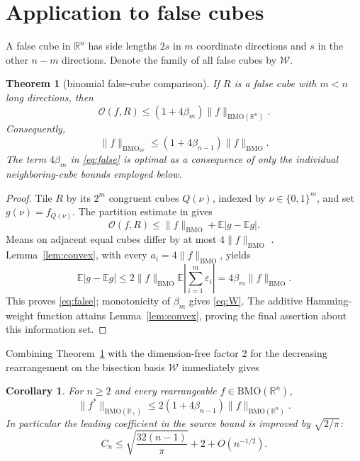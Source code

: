 \documentclass[11pt]{article}
\newtheorem{theorem}{Theorem}
\newtheorem{corollary}{Corollary}
\newcommand{\E}{\mathbb E}
\newcommand{\BMO}{\mathrm{BMO}}
\newcommand{\cO}{\mathcal O}
\begin{document}
\section{Application to false cubes}

A false cube in $\mathbb R^n$ has side lengths $2s$ in $m$ coordinate
directions and $s$ in the other $n-m$ directions.  Denote the family of all
false cubes by $\mathcal W$.

\begin{theorem}[binomial false-cube comparison]\label{thm:false}
If $R$ is a false cube with $m<n$ long directions, then
\begin{equation}\label{eq:false}
 \cO(f,R)\le (1+4\beta_m)\|f\|_{\BMO(\mathbb R^n)}.
\end{equation}
Consequently,
\begin{equation}\label{eq:W}
 \|f\|_{\BMO_{\mathcal W}}
 \le (1+4\beta_{n-1})\|f\|_{\BMO}.
\end{equation}
The term $4\beta_m$ in \eqref{eq:false} is optimal as a consequence of only
the individual neighboring-cube bounds employed below.
\end{theorem}

\begin{proof}
Tile $R$ by its $2^m$ congruent cubes $Q(\nu)$, indexed by
$\nu\in\{0,1\}^m$, and set $g(\nu)=f_{Q(\nu)}$.  The partition estimate in
\cite[Lemma 3.6]{BDG} gives
\[
 \cO(f,R)\le \|f\|_{\BMO}+\E|g-\E g|.
\]
Means on adjacent equal cubes differ by at most $4\|f\|_{\BMO}$
\cite[Lemma 3.7]{BDG}.  Lemma~\ref{lem:convex}, with every
$a_i=4\|f\|_{\BMO}$, yields
\[
 \E|g-\E g|
 \le 2\|f\|_{\BMO}\E\left|\sum_{i=1}^m\varepsilon_i\right|
 =4\beta_m\|f\|_{\BMO}.
\]
This proves \eqref{eq:false}; monotonicity of $\beta_m$ gives \eqref{eq:W}.
The additive Hamming-weight function attains Lemma~\ref{lem:convex}, proving
the final assertion about this information set.
\end{proof}

Combining Theorem~\ref{thm:false} with the dimension-free factor 2 for the
decreasing rearrangement on the bisection basis $\mathcal W$
\cite[Lemma 3.5]{BDG} immediately gives
\begin{corollary}\label{cor:simple}
For $n\ge2$ and every rearrangeable $f\in\BMO(\mathbb R^n)$,
\begin{equation}\label{eq:simple}
 \|f^*\|_{\BMO(\mathbb R_+)}
 \le 2(1+4\beta_{n-1})\|f\|_{\BMO(\mathbb R^n)}.
\end{equation}
In particular the leading coefficient in the source bound is improved by
$\sqrt{2/\pi}$:
\[
 C_n\le \sqrt{\frac{32(n-1)}\pi}+2+O(n^{-1/2}).
\]
\end{corollary}
\end{document}
